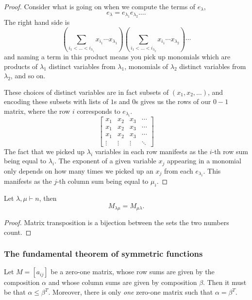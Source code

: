\documentclass{article}
\begin{document}
\begin{proof}

    Consider what is going on when we compute the terms of $e_\lambda$,
    \[
        e_\lambda = e_{\lambda_1}e_{\lambda_2}\ldots.
    \]
    The right hand side is
    \[
        \left(\sum_{i_1<\ldots<i_{\lambda_1}} x_{i_1}\cdots x_{\lambda_1}\right)\left(\sum_{i_1<\ldots<i_{\lambda_2}} x_{i_1}\cdots x_{\lambda_2}\right)\cdots
    \]
    and naming a term in this product means you pick up monomials which are products of $\lambda_1$ distinct variables from $\lambda_1$, monomials of $\lambda_2$ distinct variables from $\lambda_2$, and so on. 
    
    These choices of distinct variables are in fact subsets of $(x_1, x_2, \ldots)$, and encoding these subsets with lists of $1$s and $0$s gives us the rows of our $0-1$ matrix, where the row $i$ corresponds to $e_{\lambda_i}$.     
    \[
        \begin{bmatrix}
            x_1 & x_2 & x_3 & \cdots \\
            x_1 & x_2 & x_3 & \cdots \\
            x_1 & x_2 & x_3 & \cdots \\
            \vdots & \vdots & \vdots & \ddots 
        \end{bmatrix}
    \]
    The fact that we picked up $\lambda_i$ variables in each row manifests as the $i$-th row sum being equal to $\lambda_i$.
The exponent of a given variable $x_j$ appearing in a monomial only depends on how many times we picked up an $x_j$ from each $e_{\lambda_i}$. 
This manifests as the $j$-th column sum being equal to $\mu_i$.


\end{proof}

\begin{theorem} \label{e2msymmetric}
    Let $\lambda,\mu \vdash n$, then
    \[
        M_{\lambda\mu} = M_{\mu\lambda}.
    \]
\end{theorem}

\begin{proof}
    Matrix transposition is a bijection between the sets the two numbers count.
\end{proof}

\subsubsection{The fundamental theorem of symmetric functions}
\begin{theorem} \label{galeryser} Let $M = [a_{ij}]$ be a zero-one matrix, whose row sums are given by the composition $\alpha$ and whose column sums are given by composition $\beta$. Then it must be that $\alpha \leq \beta^T$. Moreover, there is only \textit{one} zero-one matrix such that $\alpha = \beta^T$.
\end{theorem}
\end{document}
